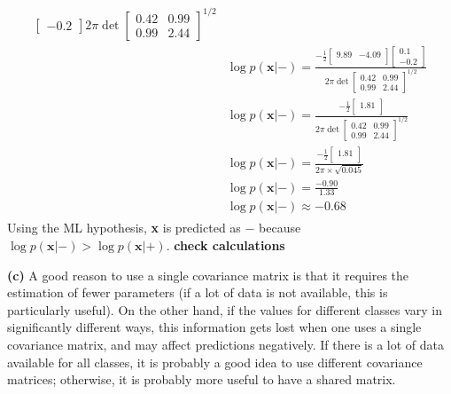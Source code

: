 \documentclass[leqno]{article}
\begin{document}
\begin{gather*}
\begin{split}
{\begin{bmatrix}
   -0.2 
\end{bmatrix}}{2\pi\det{\begin{bmatrix}
   0.42 & 0.99\\
   0.99 & 2.44 
\end{bmatrix}}^{1/2}}\\
&\log p(\textbf{x}|-) = 
\frac{-\frac{1}{2}\begin{bmatrix}
   9.89 & -4.09\\ 
\end{bmatrix}\begin{bmatrix}
   0.1\\
  -0.2 
\end{bmatrix}}{2\pi\det{\begin{bmatrix}
   0.42 & 0.99\\
   0.99 & 2.44 
\end{bmatrix}}^{1/2}}\\
&\log p(\textbf{x}|-) = 
\frac{-\frac{1}{2}\begin{bmatrix}
   1.81\\ 
\end{bmatrix}}{2\pi\det{\begin{bmatrix}
   0.42 & 0.99\\
   0.99 & 2.44 
\end{bmatrix}}^{1/2}}\\
&\log p(\textbf{x}|-) = 
\frac{-\frac{1}{2}\begin{bmatrix}
   1.81\\ 
\end{bmatrix}}{2\pi \times \sqrt{0.045}}\\
&\log p(\textbf{x}|-) = 
\frac{-0.90}{1.33}\\
& \log p(\textbf{x}|-) \approx -0.68
\end{split}
\end{gather*}
Using the ML hypothesis, \textbf{x} is predicted as $-$ because $\log p(\textbf{x}|-) > \log p(\textbf{x}|+)$. \textbf{check calculations}

\hfill

\noindent \textbf{(c)} A good reason to use a single covariance matrix is that it requires the estimation of fewer parameters (if a lot of 
data is not available, this is particularly useful). On the other hand, if the values for different 
classes vary in significantly different ways, this information gets lost when one uses a single covariance matrix, and may  affect predictions negatively. 
If there is a lot of data available for all classes, it is probably a good idea to use different covariance matrices; otherwise, it is probably more useful 
to have a shared matrix.
\end{document}
